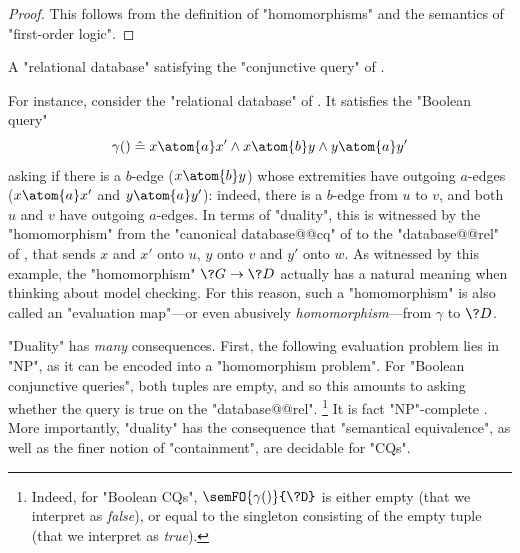 \begin{proof}
	This follows from the definition of "homomorphisms" and
	the semantics of "first-order logic".
\end{proof}
\begin{marginfigure}
	\centering
	\caption{\AP\label{fig:prelim-db-stupid-ex}
		A "relational database" satisfying the "conjunctive query" of 
		.
	}
\end{marginfigure}
For instance, consider the "relational database" of .
It satisfies the "Boolean query" 
\[
	\gamma() \defeq x \atom{a} x' \land x \atom{b} y \land y \atom{a} y'
\]
asking if there is a $b$-edge ($x \atom{b} y$) whose extremities
have outgoing $a$-edges ($x \atom{a} x'$ and $y \atom{a} y'$):
indeed, there is a $b$-edge from $u$ to $v$, and both $u$ and $v$
have outgoing $a$-edges. In terms of "duality", this is
witnessed by the "homomorphism" from the
"canonical database@@cq" of  to the
"database@@rel" of ,
that sends $x$ and $x'$ onto $u$, $y$ onto $v$ and $y'$ onto $w$.
As witnessed by this example, the "homomorphism" $\?G \to \?D$ actually has a
natural meaning when thinking about model checking.
For this reason, such a "homomorphism" is also called an "evaluation map"---or even
abusively \emph{homomorphism}---from $\gamma$ to $\?D$.

"Duality" has \emph{many} consequences. First, the following evaluation problem
lies in "NP", as it can be encoded into a "homomorphism problem".
For "Boolean conjunctive queries", both tuples are empty, and so
this amounts to asking whether the query is true on the "database@@rel".%
\footnote{Indeed, for "Boolean CQs",
$\semFO{\gamma()}{\?D}$ is either empty (that we interpret as \emph{false}),
or equal to the singleton consisting of the empty tuple (that we interpret as \emph{true}).}
It is fact "NP"-complete \cite[Theorem 7]{ChandraMerlin1977Implementation}.
More importantly, "duality" has the consequence that
"semantical equivalence", as well as the finer notion of "containment",
are decidable for "CQs".

